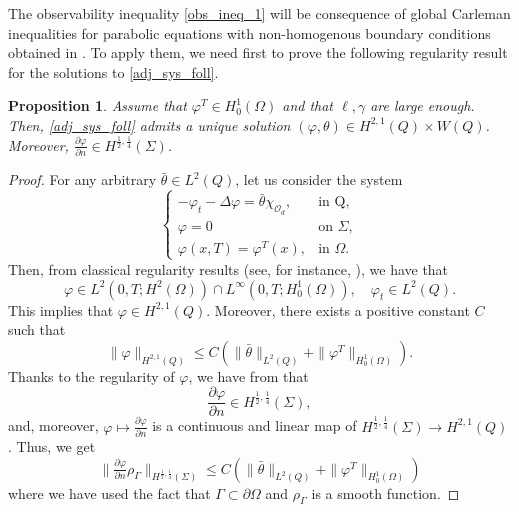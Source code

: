 \documentclass[preprint,10pt]{article}
\newtheorem{proposition}[theorem]{Proposition}
\numberwithin{equation}{section}
\numberwithin{theorem}{section}
\def\csbd{\rho_{\Gamma}}
\begin{document}
{The observability inequality \eqref{obs_ineq_1} will be consequence of global Carleman inequalities for parabolic equations with non-homogenous boundary conditions obtained in \cite{ima_yama_boundary}. To apply them, we need first to prove the following regularity result for the solutions to \eqref{adj_sys_foll}.

\begin{proposition}\label{prof_regularity}
Assume that $\varphi^T\in H_0^1(\Omega)$ and that $\ell,\gamma$ are large enough. Then, \eqref{adj_sys_foll} admits a unique solution $(\varphi,\theta)\in H^{2,1}(Q)\times W(Q)$. Moreover, $\frac{\partial \varphi}{\partial n}\in H^{\frac12,\frac14}(\Sigma)$. 
\end{proposition}
%
\begin{proof}
For any arbitrary $\bar \theta\in L^2(Q)$, let us consider the system
%
\begin{equation}\label{heat_fixed}
\begin{cases}
-\varphi_t-\Delta \varphi=\bar\theta\chi_{\mathcal O_d}, & \text{in Q}, \\
\varphi=0 &\text{on } \Sigma, \\
\varphi(x,T)=\varphi^T(x), & \text{in } \Omega.
\end{cases}
\end{equation}
%
Then, from classical regularity results (see, for instance, \cite{evans}), we have that 
%
\begin{equation*}
\varphi\in L^2(0,T;H^2(\Omega))\cap L^\infty(0,T;H_0^1(\Omega)), \quad \varphi_t\in L^2(Q).
\end{equation*}
%
This implies that $\varphi\in H^{2,1}(Q)$. Moreover, there exists a positive constant $C$ such that
%
\begin{equation}\label{norm_varphi_h21}
\|\varphi\|_{H^{2,1}(Q)}\leq C\left(\|\bar \theta\|_{L^2(Q)}+\|\varphi^T\|_{H_{0}^{1}(\Omega)} \right).
\end{equation}
%
Thanks to the regularity of $\varphi$, we have from \cite[Th. 2.1, p.9]{lions_magenes} that 
%
\begin{equation*}
\frac{\partial\varphi}{\partial n}\in H^{\frac12,\frac14}(\Sigma),
\end{equation*}
%
and, moreover,  $\varphi \mapsto \frac{\partial \varphi }{\partial n}$ is a continuous and linear map of $H^{\frac12,\frac14}(\Sigma)\to H^{2,1}(Q)$. Thus, we get
%
\begin{equation}\label{est_phi_h1214}
\|\tfrac{\partial \varphi}{\partial n}\csbd\|_{H^{\frac12,\frac14}(\Sigma)}\leq C\left(\|\bar \theta\|_{L^2(Q)}+\|\varphi^T\|_{H_{0}^{1}(\Omega)} \right)
\end{equation}
%
where we have used the fact that $\Gamma\subset \partial \Omega$ and $\csbd$ is a smooth function. 


\end{proof}}
\end{document}

